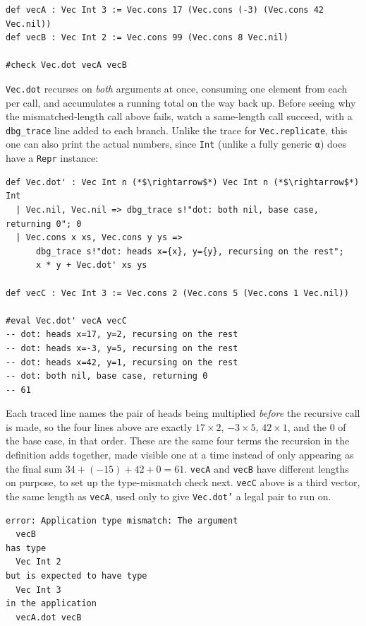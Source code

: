 \begin{lstlisting}
def vecA : Vec Int 3 := Vec.cons 17 (Vec.cons (-3) (Vec.cons 42 Vec.nil))
def vecB : Vec Int 2 := Vec.cons 99 (Vec.cons 8 Vec.nil)

#check Vec.dot vecA vecB
\end{lstlisting}

\texttt{Vec.dot} recurses on \emph{both} arguments at once, consuming one element from each per call, and accumulates a running total on the way back up. Before seeing why the mismatched-length call above fails, watch a same-length call succeed, with a \texttt{dbg\_\allowbreak{}trace} line added to each branch. Unlike the trace for \texttt{Vec.replicate}, this one can also print the actual numbers, since \texttt{Int} (unlike a fully generic \texttt{α}) does have a \texttt{Repr} instance:

\begin{lstlisting}
def Vec.dot' : Vec Int n (*$\rightarrow$*) Vec Int n (*$\rightarrow$*) Int
  | Vec.nil, Vec.nil => dbg_trace s!"dot: both nil, base case, returning 0"; 0
  | Vec.cons x xs, Vec.cons y ys =>
      dbg_trace s!"dot: heads x={x}, y={y}, recursing on the rest";
      x * y + Vec.dot' xs ys

def vecC : Vec Int 3 := Vec.cons 2 (Vec.cons 5 (Vec.cons 1 Vec.nil))

#eval Vec.dot' vecA vecC
-- dot: heads x=17, y=2, recursing on the rest
-- dot: heads x=-3, y=5, recursing on the rest
-- dot: heads x=42, y=1, recursing on the rest
-- dot: both nil, base case, returning 0
-- 61
\end{lstlisting}

Each traced line names the pair of heads being multiplied \emph{before} the recursive call is made, so the four lines above are exactly \(17 \times 2\), \(-3 \times 5\), \(42 \times 1\), and the \(0\) of the base case, in that order. These are the same four terms the recursion in the definition adds together, made visible one at a time instead of only appearing as the final sum \(34 + (-15) + 42 + 0 = 61\). \texttt{vecA} and \texttt{vecB} have different lengths on purpose, to set up the type-mismatch check next. \texttt{vecC} above is a third vector, the same length as \texttt{vecA}, used only to give \texttt{Vec.dot'} a legal pair to run on.

\begin{lstlisting}
error: Application type mismatch: The argument
  vecB
has type
  Vec Int 2
but is expected to have type
  Vec Int 3
in the application
  vecA.dot vecB
\end{lstlisting}

